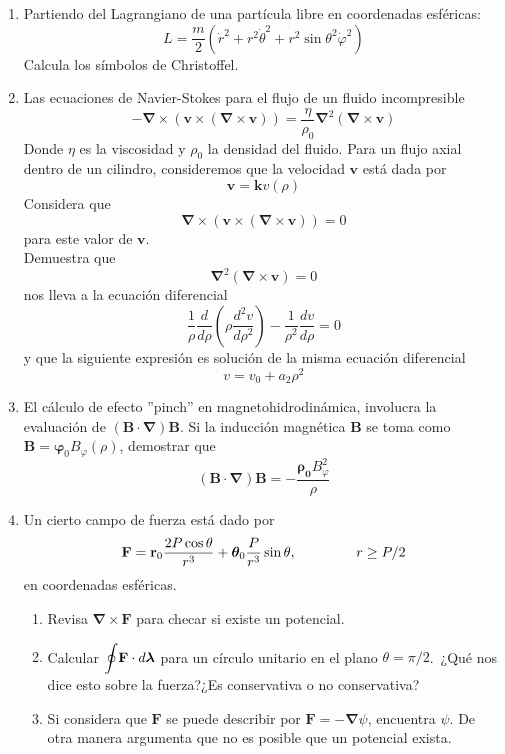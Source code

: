 \documentclass[12pt]{article}
\begin{document}
\begin{enumerate}
\item Partiendo del Lagrangiano de una partícula libre en coordenadas esféricas:
\[ L = \dfrac{m}{2} \left( \dot{r}^{2} + r^{2} \dot{\theta}^{2} + r^{2} \sin \theta^{2} \dot{\varphi}^{2} \right)\]
Calcula los símbolos de Christoffel.
\item Las ecuaciones de Navier-Stokes para el flujo de un fluido incompresible
\[ - \bm{\nabla} \times ( \mathbf{v} \times (\bm{\nabla} \times \mathbf{v} )) =  \dfrac{\eta}{\rho_{0}} \bm{\nabla}^{2} (\bm{\nabla} \times \mathbf{v}) \]
Donde $\eta$ es la viscosidad y $\rho_{0}$ la densidad del fluido. Para un flujo axial dentro de un cilindro, consideremos que la velocidad $\mathbf{v}$ está dada por
\[ \mathbf{v} =  \mathbf{k} v (\rho) \]
Considera que
\[ \bm{\nabla} \times (\mathbf{v} \times (\bm{\nabla} \times \mathbf{v})) = 0 \]
para este valor de $\mathbf{v}$.
\\
Demuestra que
\[ \bm{\nabla}^{2} ( \bm{\nabla} \times \mathbf{v}) = 0  \]
nos lleva a la ecuación diferencial
\[ \dfrac{1}{\rho} \dfrac{d}{d \rho} \left( \rho \dfrac{d^{2} v}{d \rho^{2}} \right) -  \dfrac{1}{\rho^{2}} \dfrac{d v}{d \rho} = 0 \]
y que la siguiente expresión es solución de la misma ecuación diferencial
\[ v = v_{0} + a_{2} \rho^{2} \]
\item El cálculo de efecto ''pinch'' en magnetohidrodinámica, involucra la evaluación de $(\mathbf{B} \cdot \bm{\nabla}) \mathbf{B}$. Si la inducción magnética $\mathbf{B}$ se toma como $\mathbf{B} = \bm{\varphi}_{0} B_{\varphi} (\rho)$, demostrar que
\[ (\mathbf{B} \cdot \bm{\nabla}) \mathbf{B} = - \dfrac{\bm{\rho_{0}} B_{\varphi}^{2}}{\rho}	 \]
\item Un cierto campo de fuerza está dado por
\[ \mathbf{F} = \mathbf{r}_{0} \dfrac{2 P \cos \theta}{r^{3}} + \bm{\theta}_{0} \dfrac{P}{r^{3}} \sin \theta, \hspace{1.5cm} r \geq P/2 \]
en coordenadas esféricas.
\begin{enumerate}
\item Revisa $\bm{\nabla} \times \mathbf{F}$ para checar si existe un potencial.
\item Calcular $\mathlarger{\oint} \mathbf{F} \cdot d \bm{\lambda}$ para un círculo unitario en el plano $\theta = \pi/2$.\
¿Qué nos dice esto sobre la fuerza?¿Es conservativa o no conservativa?
\item Si considera que $\mathbf{F}$ se puede describir por $\mathbf{F} = - \bm{\nabla}\psi$, encuentra $\psi$. De otra manera argumenta que no es posible que un potencial exista.
\end{enumerate}

\end{enumerate}
\end{document}
